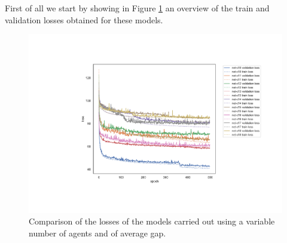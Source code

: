 First of all we start by showing in Figure \ref{fig:commexlossallt} an overview of 
the train and validation losses obtained for these models.
\begin{figure}[!htb]
	\centering
	\includegraphics[width=.8\textwidth]{contents/images/task1-comm-extension/loss-communication-all@}%
	\caption[Comparison of losses of the second set of experiments.]{Comparison 
		of the losses of the models carried out using a variable number of agents and 
		of average gap.}
	\label{fig:commexlossallt}
\end{figure}

